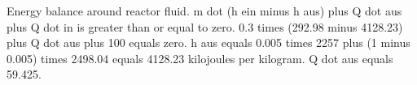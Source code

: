 Energy balance around reactor fluid. m dot (h ein minus h aus) plus Q dot aus plus Q dot in is greater than or equal to zero. 0.3 times (292.98 minus 4128.23) plus Q dot aus plus 100 equals zero. h aus equals 0.005 times 2257 plus (1 minus 0.005) times 2498.04 equals 4128.23 kilojoules per kilogram. Q dot aus equals 59.425.